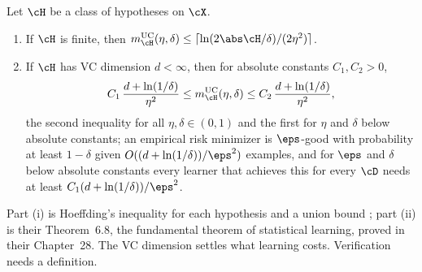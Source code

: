 \begin{refsection}

\begin{theorem}\label{thm:pacverify:fundamental}
Let $\cH$ be a class of hypotheses on $\cX$.
\begin{enumerate}
\item If $\cH$ is finite, then $\pacverifyuc(\eta,\delta)\le\lceil\ln(2\abs\cH/\delta)/(2\eta^2)\rceil$.
\item If $\cH$ has VC dimension $d<\infty$, then for absolute constants $C_1,C_2>0$,
\[C_1\,\frac{d+\ln(1/\delta)}{\eta^2}\le\pacverifyuc(\eta,\delta)\le C_2\,\frac{d+\ln(1/\delta)}{\eta^2},\]
the second inequality for all $\eta,\delta\in(0,1)$ and the first for $\eta$ and $\delta$ below absolute constants; an empirical risk minimizer is $\eps$-good with probability at least $1-\delta$ given $O((d+\ln(1/\delta))/\eps^2)$ examples, and for $\eps$ and $\delta$ below absolute constants every learner that achieves this for every $\cD$ needs at least $C_1(d+\ln(1/\delta))/\eps^2$.
\end{enumerate}
\end{theorem}

Part (i) is Hoeffding's inequality for each hypothesis and a union bound \parencite[Corollary~4.6]{ShalevShwartzBenDavid2014}; part (ii) is their Theorem~6.8, the fundamental theorem of statistical learning, proved in their Chapter~28. The VC dimension settles what learning costs. Verification needs a definition.


\end{refsection}
